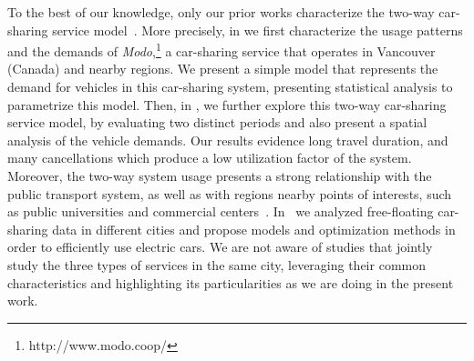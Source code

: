 To the best of our knowledge, only our prior works characterize the  two-way car-sharing service model~\cite{rooke2018caracterizacao,rooke:19}. 
More precisely, in \cite{rooke2018caracterizacao} we first characterize the usage patterns and the demands of \textit{Modo},\footnote{http://www.modo.coop/} a car-sharing service that operates in Vancouver (Canada) and nearby regions. We present a simple model that represents the demand for vehicles in this car-sharing system, presenting statistical analysis to parametrize this model. Then, in \cite{rooke:19}, we further explore this two-way car-sharing service model, by evaluating two distinct periods and also present a spatial analysis of the vehicle demands. Our results evidence long travel duration, and many cancellations which produce a low utilization factor of the system. Moreover, the two-way system usage presents a strong relationship with the public transport system, as well as with regions nearby points of interests, such as public universities and commercial centers~\cite{rooke:19}.  In~\cite{coccaopt,coccacar} we analyzed free-floating car-sharing data in different cities and propose models and optimization methods in order to efficiently use electric cars.  
We are not aware of studies that jointly study the three types of services in the same city, leveraging their common characteristics and highlighting its particularities as we are doing in the present work.